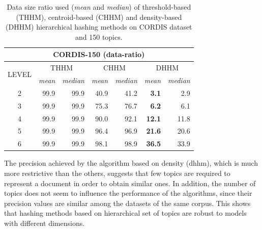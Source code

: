 \begin{table}\centering
  \scriptsize
  \begin{tabular}{c|rr||rr||rr}
    \multicolumn{7}{c}{CORDIS-150 (data-ratio)} \\
    \toprule
    \multirow{2}{*}{LEVEL} &
      \multicolumn{2}{c}{THHM} &
      \multicolumn{2}{c}{CHHM} &
      \multicolumn{2}{c}{DHHM} \\
      & {\textit{mean}} & {\textit{median}} & {\textit{mean}} & {\textit{median}} & {\textit{mean}} & {\textit{median}} \\
      \midrule
    2 & 99.9 & 99.9 & 40.9 & 41.2 & \textbf{3.1} & 2.9 \\
    3 & 99.9 & 99.9 & 75.3 & 76.7 & \textbf{6.2} & 6.1 \\
    4 & 99.9 & 99.9 & 90.0 & 92.1 & \textbf{12.1} & 11.8 \\
    5 & 99.9 & 99.9 & 96.4 & 96.9 & \textbf{21.6} & 20.6 \\
    6 & 99.9 & 99.9 & 98.1 & 98.9 & \textbf{36.5} & 33.9 \\
    \bottomrule
  \end{tabular}
\caption{Data size ratio used (\textit{mean} and \textit{median}) of threshold-based (THHM), centroid-based (CHHM) and density-based (DHHM) hierarchical hashing methods on CORDIS dataset and 150 topics.}
\label{tb:cordis150-d}
\end{table}

The precision achieved by the algorithm based on density (dhhm), which is much more restrictive than the others, suggests that few topics are required to represent a document in order to obtain similar ones. In addition, the number of topics does not seem to influence the performance of the algorithms, since their precision values are similar among the datasets of the same corpus. This shows that hashing methods based on hierarchical set of topics are robust to models with different dimensions.


